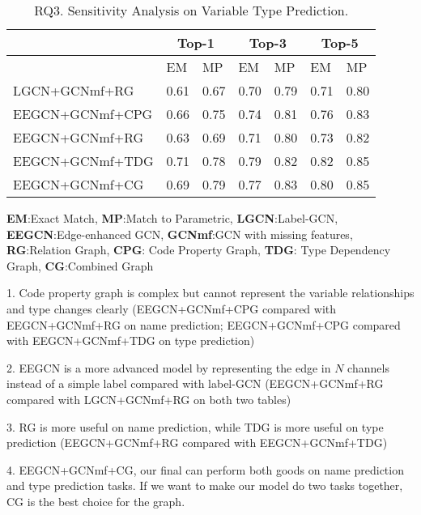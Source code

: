 \begin{table}[t]
	\caption{RQ3. Sensitivity Analysis on Variable Type Prediction.}
	\begin{center}
		\small
		\renewcommand{\arraystretch}{1} \begin{tabular}{p{2.5cm}<{\centering}|p{0.5cm}<{\centering}|p{0.5cm}<{\centering}|p{0.5cm}<{\centering}|p{0.5cm}<{\centering}|p{0.5cm}<{\centering}|p{0.5cm}<{\centering}}
			
			\hline
			& \multicolumn{2}{c}{Top-1}         & \multicolumn{2}{c}{Top-3}         & \multicolumn{2}{c}{Top-5} \\
			\hline
			& EM & MP & EM & MP & EM & MP  \\ 
			\hline
			LGCN+GCNmf+RG   & 0.61 & 0.67 & 0.70 & 0.79 & 0.71 & 0.80 \\
			EEGCN+GCNmf+CPG & 0.66 & 0.75 & 0.74 & 0.81 & 0.76 & 0.83 \\
			EEGCN+GCNmf+RG  & 0.63 & 0.69 & 0.71 & 0.80 & 0.73 & 0.82 \\
			EEGCN+GCNmf+TDG & 0.71 & 0.78 & 0.79 & 0.82 & 0.82 & 0.85 \\
			EEGCN+GCNmf+CG  & 0.69 & 0.79 & 0.77 & 0.83 & 0.80 & 0.85 \\
			\hline
		\end{tabular}
		\label{RQ3-result-2}
		{\bf EM}:Exact Match, {\bf MP}:Match to Parametric, {\bf LGCN}:Label-GCN, {\bf EEGCN}:Edge-enhanced GCN, {\bf GCNmf}:GCN with missing features, {\bf RG}:Relation Graph, {\bf CPG}: Code Property Graph, {\bf TDG}: Type Dependency Graph, {\bf CG}:Combined Graph
	\end{center}
\end{table}

1. Code property graph is complex but cannot represent the variable relationships and type changes clearly (EEGCN+GCNmf+CPG compared with EEGCN+GCNmf+RG on name prediction; EEGCN+GCNmf+CPG compared with EEGCN+GCNmf+TDG on type prediction)

2. EEGCN is a more advanced model by representing the edge in $N$ channels instead of a simple label compared with label-GCN (EEGCN+GCNmf+RG compared with LGCN+GCNmf+RG on both two tables)

3. RG is more useful on name prediction, while TDG is more useful on type prediction (EEGCN+GCNmf+RG compared with EEGCN+GCNmf+TDG)

4. EEGCN+GCNmf+CG, our final {\tool} can perform both goods on name prediction and type prediction tasks. If we want to make our model do two tasks together, CG is the best choice for the graph.
